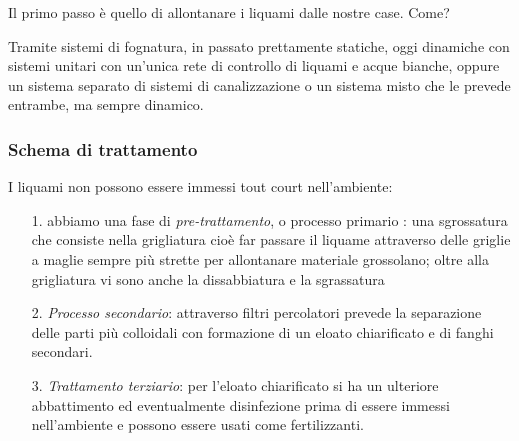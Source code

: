 Il primo passo è quello di allontanare i liquami dalle nostre case.
Come?

Tramite sistemi di fognatura, in passato prettamente statiche, oggi
dinamiche con sistemi unitari con un'unica rete di controllo di liquami
e acque bianche, oppure un sistema separato di sistemi di canalizzazione
o un sistema misto che le prevede entrambe, ma sempre dinamico.

\subsubsection{Schema di trattamento}

I liquami non possono essere immessi tout court nell'ambiente:

\begin{itemize}
\item[1.]
  abbiamo una fase di \emph{pre-trattamento}, o processo primario : una
  sgrossatura che consiste nella grigliatura cioè far passare il liquame
  attraverso delle griglie a maglie sempre più strette per allontanare
  materiale grossolano; oltre alla grigliatura vi sono anche la
  dissabbiatura e la sgrassatura
\item[2.]
  \emph{Processo secondario}: attraverso filtri percolatori prevede la
  separazione delle parti più colloidali con formazione di un eloato
  chiarificato e di fanghi secondari.
\item[3.]
  \emph{Trattamento terziario}: per l'eloato chiarificato si ha un
  ulteriore abbattimento ed eventualmente disinfezione prima di essere
  immessi nell'ambiente e possono essere usati come fertilizzanti.
\end{itemize}
